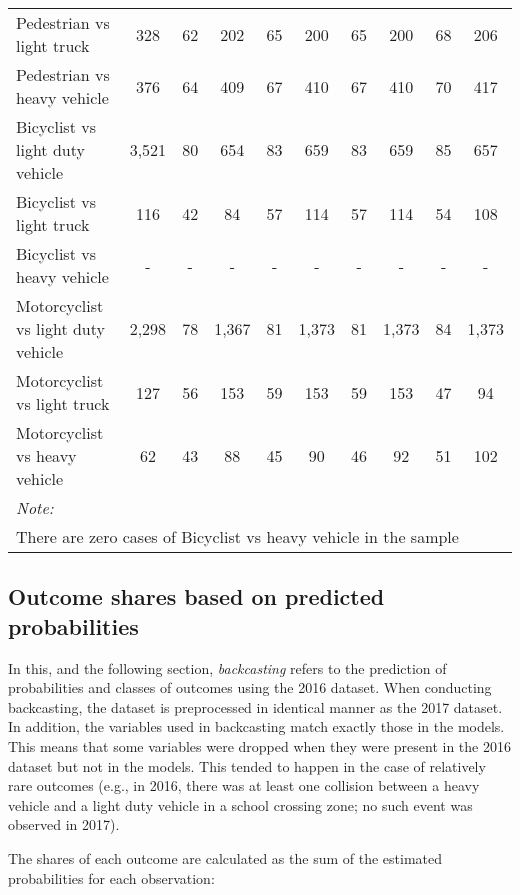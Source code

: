 \documentclass[]{elsarticle} %
\begin{document}
\begin{landscape}
\begin{table}
{\begin{tabular}[t]{lccccccccc}
\addlinespace
\rowcolor{gray!6}  Pedestrian vs light truck & 328 & 62 & 202 & 65 & 200 & 65 & 200 & 68 & 206\\
Pedestrian vs heavy vehicle & 376 & 64 & 409 & 67 & 410 & 67 & 410 & 70 & 417\\
\rowcolor{gray!6}  Bicyclist vs light duty vehicle & 3,521 & 80 & 654 & 83 & 659 & 83 & 659 & 85 & 657\\
Bicyclist vs light truck & 116 & 42 & 84 & 57 & 114 & 57 & 114 & 54 & 108\\
\rowcolor{gray!6}  Bicyclist vs heavy vehicle & - & - & - & - & - & - & - & - & -\\
\addlinespace
Motorcyclist vs light duty vehicle & 2,298 & 78 & 1,367 & 81 & 1,373 & 81 & 1,373 & 84 & 1,373\\
\rowcolor{gray!6}  Motorcyclist vs light truck & 127 & 56 & 153 & 59 & 153 & 59 & 153 & 47 & 94\\
Motorcyclist vs heavy vehicle & 62 & 43 & 88 & 45 & 90 & 46 & 92 & 51 & 102\\
\bottomrule
\multicolumn{10}{l}{\textit{Note: }}\\
\multicolumn{10}{l}{There are zero cases of Bicyclist vs heavy vehicle in the sample}\\
\end{tabular}}
\end{table}
\end{landscape}

\hypertarget{sec:outcomes-shares}{%
\subsection{Outcome shares based on predicted
probabilities}\label{sec:outcomes-shares}}

In this, and the following section, \emph{backcasting} refers to the
prediction of probabilities and classes of outcomes using the 2016
dataset. When conducting backcasting, the dataset is preprocessed in
identical manner as the 2017 dataset. In addition, the variables used in
backcasting match exactly those in the models. This means that some
variables were dropped when they were present in the 2016 dataset but
not in the models. This tended to happen in the case of relatively rare
outcomes (e.g., in 2016, there was at least one collision between a
heavy vehicle and a light duty vehicle in a school crossing zone; no
such event was observed in 2017).

The shares of each outcome are calculated as the sum of the estimated
probabilities for each observation:
\end{document}
